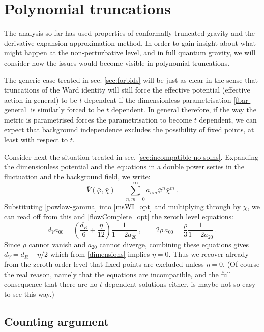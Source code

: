 \documentclass[11pt,a4paper]{article}
\numberwithin{figure}{section}
\numberwithin{equation}{section}
\newcommand{\be}{\begin{equation}}
\newcommand{\ee}{\end{equation}}
\newcommand{\bc}{\bar \chi} %
\begin{document}
\section{Polynomial truncations}
\label{sec:truncations} 

The analysis  so far has used properties of conformally truncated gravity and the derivative expansion approximation method. In order to gain insight about what might happen at the non-perturbative level, and in full quantum gravity, we will consider how the issues would become visible in polynomial truncations. 

The generic case treated in sec. \ref{sec:forbids} will be just as clear in the sense that truncations of the Ward identity will still force the effective potential (effective action in general) to be $t$ dependent if the dimensionless parametrisation \eqref{fbar-general} is similarly forced to be $t$ dependent. In general therefore, if the way the metric is parametrised forces the parametrisation to become $t$ dependent, we can expect that background independence excludes the possibility of fixed points, at least with respect to $t$.


Consider next the situation treated in sec. \ref{sec:incompatible-no-solns}. Expanding the dimensionless potential and the equations in a double power series in the fluctuation and the background field, we write:
\begin{equation}
\label{pot-expand}
\bar V(\bar\varphi,\bar\chi) = \sum_{n,m=0}^{\infty} a_{nm} \bar\varphi^n \bar\chi^m\,.
\end{equation}
Substituting \eqref{powlaw-gamma} into \eqref{msWI_opt} and multiplying through by $\bc$, we can read off from this and \eqref{flowComplete_opt} the zeroth level equations:
\be 
d_V a_{00} = \left(  \frac{d_R}{6} + \frac{\eta}{12} \right) \frac{1}{1 -  2a_{20}}\,,\qquad 2\rho\, a_{00} = \frac{\rho}{3} \frac{1}{1 -  2a_{20}}\,.
\ee
Since $\rho$ cannot vanish and $a_{20}$ cannot diverge, combining these equations gives $d_V = d_R+\eta/2$ which from \eqref{dimensions} implies $\eta=0$. Thus we recover already from the zeroth order level that fixed points are excluded unless $\eta=0$. (Of course the real reason, namely that the equations are incompatible, and the full consequence that there are no $t$-dependent solutions either, is maybe not so easy to see this way.)

\subsection{Counting argument}\label{sec:counting}
\end{document}
